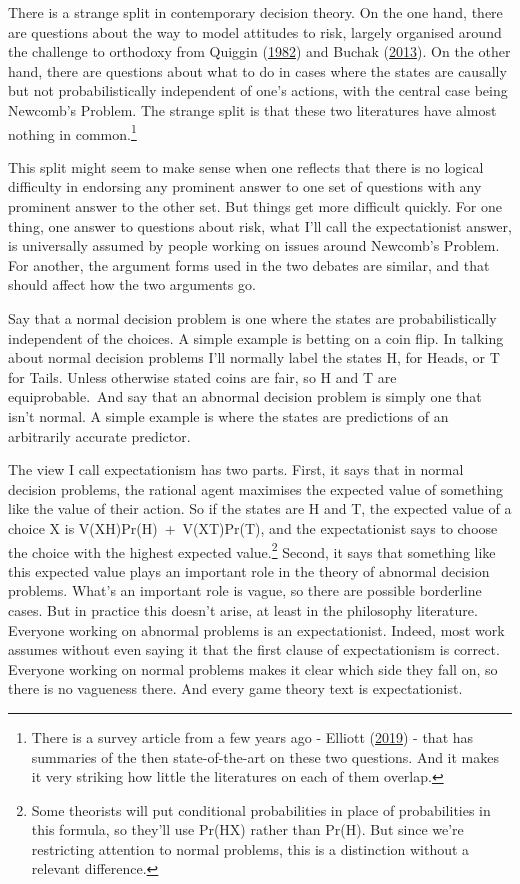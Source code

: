 \documentclass[
  12pt,
  letterpaper,
  DIV=11,
  numbers=noendperiod]{scrreprt}
\begin{document}
There is a strange split in contemporary decision theory. On the one
hand, there are questions about the way to model attitudes to risk,
largely organised around the challenge to orthodoxy from Quiggin
(\protect\hyperlink{ref-Quiggin1982}{1982}) and Buchak
(\protect\hyperlink{ref-BuchakRisk}{2013}). On the other hand, there are
questions about what to do in cases where the states are causally but
not probabilistically independent of one's actions, with the central
case being Newcomb's Problem. The strange split is that these two
literatures have almost nothing in common.\footnote{There is a survey
  article from a few years ago - Elliott
  (\protect\hyperlink{ref-Elliot2019}{2019}) - that has summaries of the
  then state-of-the-art on these two questions. And it makes it very
  striking how little the literatures on each of them overlap.}

This split might seem to make sense when one reflects that there is no
logical difficulty in endorsing any prominent answer to one set of
questions with any prominent answer to the other set. But things get
more difficult quickly. For one thing, one answer to questions about
risk, what I'll call the expectationist answer, is universally assumed
by people working on issues around Newcomb's Problem. For another, the
argument forms used in the two debates are similar, and that should
affect how the two arguments go.~

Say that a normal decision problem is one where the states are
probabilistically independent of the choices. A simple example is
betting on a coin flip. In talking about normal decision problems I'll
normally label the states H, for Heads, or T for Tails. Unless otherwise
stated coins are fair, so H and T are equiprobable.~And say that an
abnormal decision problem is simply one that isn't normal. A simple
example is where the states are predictions of an arbitrarily accurate
predictor.

The view I call expectationism has two parts. First, it says that in
normal decision problems, the rational agent maximises the expected
value of something like the value of their action. So if the states are
H and T, the expected value of a choice X is V(XH)Pr(H)~+~V(XT)Pr(T),
and the expectationist says to choose the choice with the highest
expected value.\footnote{Some theorists will put conditional
  probabilities in place of probabilities in this formula, so they'll
  use Pr(H\textbar X) rather than Pr(H). But since we're restricting
  attention to normal problems, this is a distinction without a relevant
  difference.} Second, it says that something like this expected value
plays an important role in the theory of abnormal decision problems.
What's an important role is vague, so there are possible borderline
cases. But in practice this doesn't arise, at least in the philosophy
literature. Everyone working on abnormal problems is an expectationist.
Indeed, most work assumes without even saying it that the first clause
of expectationism is correct. Everyone working on normal problems makes
it clear which side they fall on, so there is no vagueness there. And
every game theory text is expectationist.~
\end{document}
